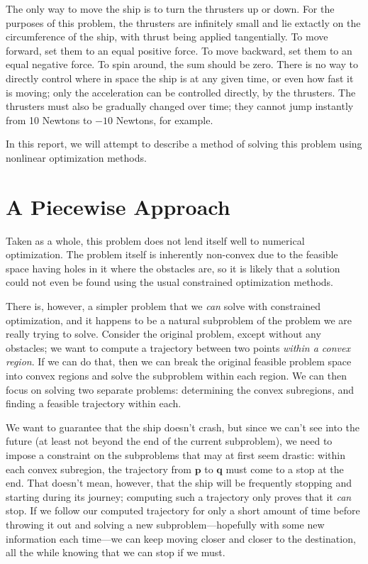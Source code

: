 \documentclass{report}
\begin{document}
The only way to move the ship is to turn the thrusters up or down. 
For the purposes of this problem, the thrusters are infinitely small
and lie extactly on the circumference of the ship, with thrust being
applied tangentially.
To
move forward, set them to an equal positive force. To move backward,
set them to an equal negative force. To spin around,
the sum should be zero. There is no
way to directly control where in space the ship is at any given time,
or even how fast it is moving; only the acceleration can be controlled
directly, by the thrusters. The thrusters must also be gradually changed
over time; they cannot jump instantly from 10 Newtons to $-10$ Newtons,
for example.
\vspace{0.5em}

In this report, we will attempt to describe a method of solving this
problem using nonlinear optimization methods.

\section{A Piecewise Approach}
Taken as a whole, this problem does not lend itself well to numerical
optimization. The problem itself is inherently non-convex due to the
feasible space having holes in it where the obstacles are, so it is likely
that a solution could not even be found using the usual constrained
optimization methods.

There is, however, a simpler problem that we \emph{can} solve with
constrained optimization, and it happens to be a natural subproblem of
the problem we are really trying to solve. Consider the original
problem, except without any obstacles; we want to compute a trajectory
between two points \emph{within a convex region}. If we can do that,
then we can break the original feasible problem space into convex
regions and solve the subproblem within each region. We can then focus
on solving two separate problems: determining the convex subregions, and 
finding a feasible trajectory within each.

We want to guarantee that the ship doesn't crash, but since we can't see
into the future (at least not beyond the end of the current subproblem),
we need to impose a constraint on the subproblems that
may at first seem drastic:
within each convex subregion, the trajectory from $\mathbf{p}$ to
$\mathbf{q}$ must come to a stop at the end. That doesn't mean, however, that the
ship will be frequently stopping and starting during its journey;
computing such a trajectory only proves that it \emph{can} stop. If we
follow our computed trajectory for only a short amount of time before
throwing it out and solving a new subproblem---hopefully with some new
information each time---we can keep moving closer and closer to the
destination, all the while knowing that we can stop if we must.
\end{document}
